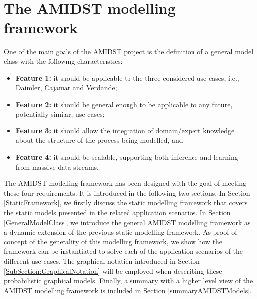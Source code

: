 \section{The AMIDST modelling framework}\label{section:AMIDSTmodelClass}

One of the main goals of the AMIDST project is the definition of a general model class with the following characteristics: 

\begin{itemize}
\item \textbf{Feature 1:} it should be applicable to the three considered use-cases, i.e., Daimler, Cajamar and Verdande;

\item \textbf{Feature 2:}  it should be general enough to be applicable to any future, potentially similar, use-cases;

\item \textbf{Feature 3:} it should allow the integration of domain/expert knowledge about the structure of the process being modelled, and

\item \textbf{Feature 4:} it should be scalable, supporting both inference and learning from massive data streams.

\end{itemize}



The AMIDST modelling framework has been designed with the goal of meeting these four requirements. It is introduced in
the following two sections. In Section \ref{StaticFramework}, we firstly discuss the static modelling framework that
covers the static models presented in the related application scenarios. In Section \ref{GeneralModelClass}, we
introduce the general AMIDST modelling framework as a dynamic extension of the previous static modelling framework. As
proof of concept of the generality of this modelling framework, we show how the framework can be instantiated to solve each of the application scenarios of the different use cases. The graphical notation introduced in Section \ref{SubSection:GraphicalNotation} will be employed when describing these probabilistic graphical models. Finally, a summary with a higher level view of the AMIDST modelling framework is included in Section \ref{summaryAMIDSTModels}.

